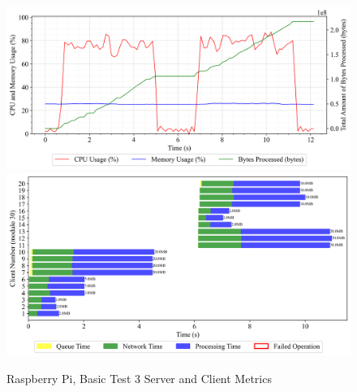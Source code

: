 \newpage
\begin{figure}[h!t]
    \begin{center}
    \label{Fig:A1.15}
    \caption{Raspberry Pi, Basic Test 3 Server and Client Metrics}
    \includegraphics[width=\xLarge\textwidth]{Chapter4/Results/raspberry-pi_results/raspberry-pi_basic_3_20241004_140137.db_server_metrics.png}
    \includegraphics[width=\xLarge\textwidth]{Chapter4/Results/raspberry-pi_results/raspberry-pi_basic_3_20241004_140137.db_client_tasks.png}
    \end{center}
\end{figure}

